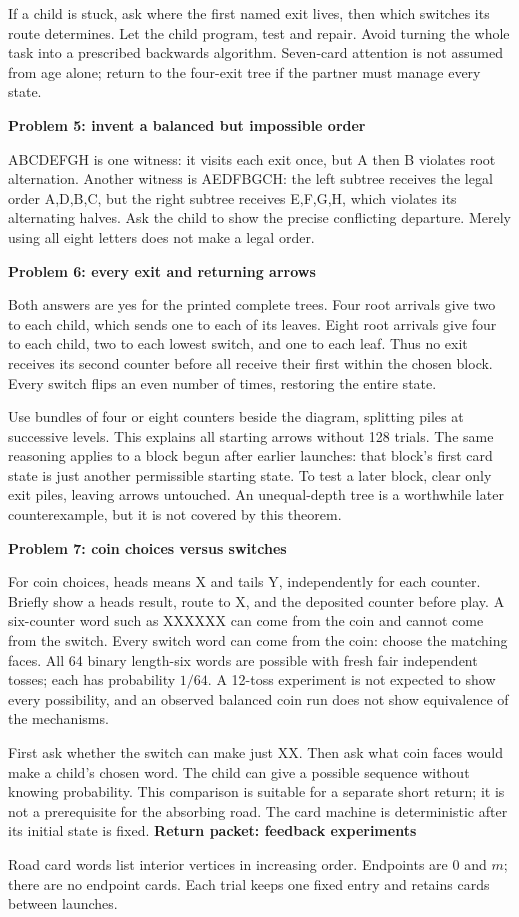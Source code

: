\documentclass[11pt]{article}
\newcommand{\head}[1]{\vspace{3pt}\textbf{\large #1}\par}
\newcommand{\prob}[1]{\vspace{3pt}\textbf{#1}\par}
\begin{document}
If a child is stuck, ask where the first named exit lives, then which switches its route determines. Let the child program, test and repair. Avoid turning the whole task into a prescribed backwards algorithm. Seven-card attention is not assumed from age alone; return to the four-exit tree if the partner must manage every state.

\prob{Problem 5: invent a balanced but impossible order}
ABCDEFGH is one witness: it visits each exit once, but A then B violates root alternation. Another witness is AEDFBGCH: the left subtree receives the legal order A,D,B,C, but the right subtree receives E,F,G,H, which violates its alternating halves. Ask the child to show the precise conflicting departure. Merely using all eight letters does not make a legal order.

\prob{Problem 6: every exit and returning arrows}
Both answers are yes for the printed complete trees. Four root arrivals give two to each child, which sends one to each of its leaves. Eight root arrivals give four to each child, two to each lowest switch, and one to each leaf. Thus no exit receives its second counter before all receive their first within the chosen block. Every switch flips an even number of times, restoring the entire state.

Use bundles of four or eight counters beside the diagram, splitting piles at successive levels. This explains all starting arrows without 128 trials. The same reasoning applies to a block begun after earlier launches: that block's first card state is just another permissible starting state. To test a later block, clear only exit piles, leaving arrows untouched. An unequal-depth tree is a worthwhile later counterexample, but it is not covered by this theorem.

\prob{Problem 7: coin choices versus switches}
For coin choices, heads means X and tails Y, independently for each counter. Briefly show a heads result, route to X, and the deposited counter before play. A six-counter word such as XXXXXX can come from the coin and cannot come from the switch. Every switch word can come from the coin: choose the matching faces. All 64 binary length-six words are possible with fresh fair independent tosses; each has probability $1/64$. A 12-toss experiment is not expected to show every possibility, and an observed balanced coin run does not show equivalence of the mechanisms.

First ask whether the switch can make just XX. Then ask what coin faces would make a child's chosen word. The child can give a possible sequence without knowing probability. This comparison is suitable for a separate short return; it is not a prerequisite for the absorbing road. The card machine is deterministic after its initial state is fixed.
\newpage
\head{Return packet: feedback experiments}
Road card words list interior vertices in increasing order. Endpoints are 0 and $m$; there are no endpoint cards. Each trial keeps one fixed entry and retains cards between launches.
\end{document}
